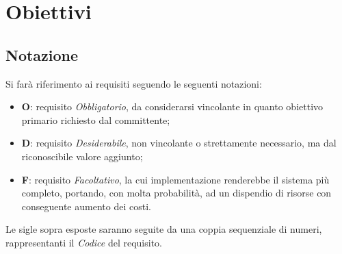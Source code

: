 \section{Obiettivi}
\subsection{Notazione}
Si farà riferimento ai requisiti seguendo le seguenti notazioni:
\begin{itemize}
\item \textbf{O}: requisito \textit{Obbligatorio}, da considerarsi vincolante in quanto obiettivo primario richiesto dal committente;
\item \textbf{D}: requisito \textit{Desiderabile}, non vincolante o strettamente necessario, ma dal riconoscibile valore aggiunto;
\item \textbf{F}: requisito \textit{Facoltativo}, la cui implementazione renderebbe il sistema più completo, portando,
con molta probabilità, ad un dispendio di risorse con conseguente aumento dei
costi.
\end{itemize}
Le sigle sopra esposte saranno seguite da una coppia sequenziale di numeri, rappresentanti il \textit{Codice} del requisito.

